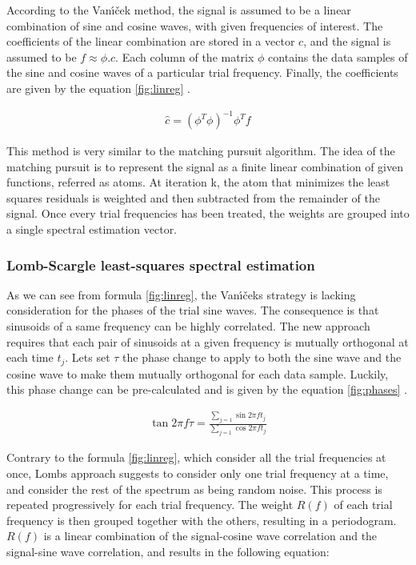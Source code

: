 \documentclass[letterpaper]{article}
\begin{document}
According to the Van\'{\i}\v{c}ek method, the signal is assumed to be a linear combination of sine and cosine waves, with given frequencies of interest.
The coefficients of the linear combination are stored in a vector $c$, and the signal is assumed to be $f \approx \phi.c$. 
Each column of the matrix $\phi$ contains the data samples of the sine and cosine waves of a particular trial frequency.
Finally, the coefficients are given by the equation \ref{fig:linreg} \citep{PS}.

\begin{align}
\hat{c} = (\phi^{T} \phi)^{-1} \phi^{T} f
\label{fig:linreg}
\end{align}

This method is very similar to the matching pursuit algorithm. The idea of the matching pursuit is to represent the signal as a finite linear combination of given
functions, referred as atoms. At iteration k, the atom that minimizes the least squares residuals is weighted and then subtracted from 
the remainder of the signal. Once every trial frequencies has been treated, the weights are grouped into a single spectral estimation vector.

\subsubsection{Lomb-Scargle least-squares spectral estimation}

As we can see from formula \ref{fig:linreg}, the Van\'{\i}\v{c}ek\textquotesingle s strategy is lacking consideration for the phases of the trial sine waves.
The consequence is that sinusoids of a same frequency can be highly correlated. The new approach requires that each pair of sinusoids at a given frequency
is mutually orthogonal at each time $t_{j}$. Let\textquotesingle s set $\tau$ the phase change to apply to both the sine wave and the cosine wave to make
them mutually orthogonal for each data sample. Luckily, this phase change can be pre-calculated and is given by the equation \ref{fig:phases} \citep{LS}.

\begin{align}
\tan 2\pi f \tau = \frac{\sum\limits_{j=1} \sin 2\pi f t_{j}}{\sum\limits_{j=1} \cos 2\pi f t_{j}}
\label{fig:phases}
\end{align}

Contrary to the formula \ref{fig:linreg}, which consider all the trial frequencies at once, Lomb\textquotesingle s approach suggests to consider only one
trial frequency at a time, and consider the rest of the spectrum as being random noise. This process is repeated progressively for each trial frequency. The weight $R(f)$ of each trial frequency is then grouped together with the others, resulting in a periodogram. $R(f)$ is a linear combination of
the signal-cosine wave correlation and the signal-sine wave correlation, and results in the following equation:
\end{document}
